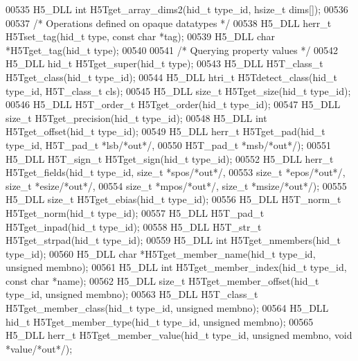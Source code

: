 \begin{DoxyCode}
00535 H5\_DLL \textcolor{keywordtype}{int} H5Tget\_array\_dims2(hid\_t type\_id, hsize\_t dims[]);
00536 
00537 \textcolor{comment}{/* Operations defined on opaque datatypes */}
00538 H5\_DLL herr\_t H5Tset\_tag(hid\_t type, \textcolor{keyword}{const} \textcolor{keywordtype}{char} *tag);
00539 H5\_DLL \textcolor{keywordtype}{char} *H5Tget\_tag(hid\_t type);
00540 
00541 \textcolor{comment}{/* Querying property values */}
00542 H5\_DLL hid\_t H5Tget\_super(hid\_t type);
00543 H5\_DLL H5T\_class\_t H5Tget\_class(hid\_t type\_id);
00544 H5\_DLL htri\_t H5Tdetect\_class(hid\_t type\_id, H5T\_class\_t cls);
00545 H5\_DLL \textcolor{keywordtype}{size\_t} H5Tget\_size(hid\_t type\_id);
00546 H5\_DLL H5T\_order\_t H5Tget\_order(hid\_t type\_id);
00547 H5\_DLL \textcolor{keywordtype}{size\_t} H5Tget\_precision(hid\_t type\_id);
00548 H5\_DLL \textcolor{keywordtype}{int} H5Tget\_offset(hid\_t type\_id);
00549 H5\_DLL herr\_t H5Tget\_pad(hid\_t type\_id, H5T\_pad\_t *lsb\textcolor{comment}{/*out*/},
00550               H5T\_pad\_t *msb\textcolor{comment}{/*out*/});
00551 H5\_DLL H5T\_sign\_t H5Tget\_sign(hid\_t type\_id);
00552 H5\_DLL herr\_t H5Tget\_fields(hid\_t type\_id, \textcolor{keywordtype}{size\_t} *spos\textcolor{comment}{/*out*/},
00553                  \textcolor{keywordtype}{size\_t} *epos\textcolor{comment}{/*out*/}, \textcolor{keywordtype}{size\_t} *esize\textcolor{comment}{/*out*/},
00554                  \textcolor{keywordtype}{size\_t} *mpos\textcolor{comment}{/*out*/}, \textcolor{keywordtype}{size\_t} *msize\textcolor{comment}{/*out*/});
00555 H5\_DLL \textcolor{keywordtype}{size\_t} H5Tget\_ebias(hid\_t type\_id);
00556 H5\_DLL H5T\_norm\_t H5Tget\_norm(hid\_t type\_id);
00557 H5\_DLL H5T\_pad\_t H5Tget\_inpad(hid\_t type\_id);
00558 H5\_DLL H5T\_str\_t H5Tget\_strpad(hid\_t type\_id);
00559 H5\_DLL \textcolor{keywordtype}{int} H5Tget\_nmembers(hid\_t type\_id);
00560 H5\_DLL \textcolor{keywordtype}{char} *H5Tget\_member\_name(hid\_t type\_id, \textcolor{keywordtype}{unsigned} membno);
00561 H5\_DLL \textcolor{keywordtype}{int} H5Tget\_member\_index(hid\_t type\_id, \textcolor{keyword}{const} \textcolor{keywordtype}{char} *name);
00562 H5\_DLL \textcolor{keywordtype}{size\_t} H5Tget\_member\_offset(hid\_t type\_id, \textcolor{keywordtype}{unsigned} membno);
00563 H5\_DLL H5T\_class\_t H5Tget\_member\_class(hid\_t type\_id, \textcolor{keywordtype}{unsigned} membno);
00564 H5\_DLL hid\_t H5Tget\_member\_type(hid\_t type\_id, \textcolor{keywordtype}{unsigned} membno);
00565 H5\_DLL herr\_t H5Tget\_member\_value(hid\_t type\_id, \textcolor{keywordtype}{unsigned} membno, \textcolor{keywordtype}{void} *value\textcolor{comment}{/*out*/});

\end{DoxyCode}
